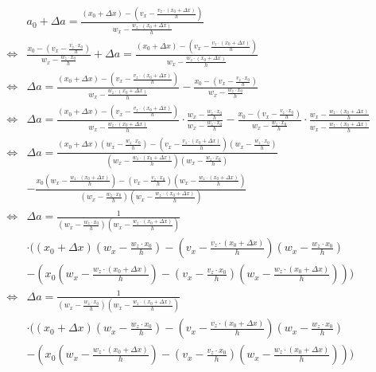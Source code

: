 \documentclass{article}
\begin{document}
\begin{align*}
         & a_0 + \Delta a = \frac{(x_0 + \Delta x) - ( v_x - \frac{v_z \cdot (x_0 + \Delta x)}{h} )}{w_x - \frac{w_z \cdot (x_0 + \Delta x)}{h}} \\
    \iff & \frac{x_0 - ( v_x - \frac{v_z \cdot x_0}{h} )}{w_x - \frac{w_z \cdot x_0}{h}} + \Delta a = \frac{(x_0 + \Delta x) - ( v_x - \frac{v_z \cdot (x_0 + \Delta x)}{h} )}{w_x - \frac{w_z \cdot (x_0 + \Delta x)}{h}} \\
    \iff & \Delta a = \frac{(x_0 + \Delta x) - ( v_x - \frac{v_z \cdot (x_0 + \Delta x)}{h} )}{w_x - \frac{w_z \cdot (x_0 + \Delta x)}{h}} - \frac{x_0 - ( v_x - \frac{v_z \cdot x_0}{h} )}{w_x - \frac{w_z \cdot x_0}{h}} \\
    \iff & \Delta a = \frac{(x_0 + \Delta x) - ( v_x - \frac{v_z \cdot (x_0 + \Delta x)}{h} )}{w_x - \frac{w_z \cdot (x_0 + \Delta x)}{h}} \cdot \frac{w_x - \frac{w_z \cdot x_0}{h}}{w_x - \frac{w_z \cdot x_0}{h}} - \frac{x_0 - ( v_x - \frac{v_z \cdot x_0}{h} )}{w_x - \frac{w_z \cdot x_0}{h}} \cdot \frac{w_x - \frac{w_z \cdot (x_0 + \Delta x)}{h}}{w_x - \frac{w_z \cdot (x_0 + \Delta x)}{h}} \\
    \iff & \Delta a = \frac{(x_0 + \Delta x)(w_x - \frac{w_z \cdot x_0}{h}) - ( v_x - \frac{v_z \cdot (x_0 + \Delta x)}{h} )(w_x - \frac{w_z \cdot x_0}{h})}{( w_x - \frac{w_z \cdot (x_0 + \Delta x)}{h} ) (w_x - \frac{w_z \cdot x_0}{h})} \\
         &- \frac{x_0 (w_x - \frac{w_z \cdot (x_0 + \Delta x)}{h}) - ( v_x - \frac{v_z \cdot x_0}{h} ) (w_x - \frac{w_z \cdot (x_0 + \Delta x)}{h})}{(w_x - \frac{w_z \cdot x_0}{h})(w_x - \frac{w_z \cdot (x_0 + \Delta x)}{h})} \\
    \iff & \Delta a = \frac{1}{(w_x - \frac{w_z \cdot x_0}{h})(w_x - \frac{w_z \cdot (x_0 + \Delta x)}{h})} \\ 
         &\cdot ((x_0 + \Delta x)(w_x - \frac{w_z \cdot x_0}{h}) - ( v_x - \frac{v_z \cdot (x_0 + \Delta x)}{h} )(w_x - \frac{w_z \cdot x_0}{h}) \\
         &- (x_0 (w_x - \frac{w_z \cdot (x_0 + \Delta x)}{h}) - ( v_x - \frac{v_z \cdot x_0}{h} ) (w_x - \frac{w_z \cdot (x_0 + \Delta x)}{h}))) \\
    \iff & \Delta a = \frac{1}{(w_x - \frac{w_z \cdot x_0}{h})(w_x - \frac{w_z \cdot (x_0 + \Delta x)}{h})} \\ 
         &\cdot ((x_0 + \Delta x)(w_x - \frac{w_z \cdot x_0}{h}) - ( v_x - \frac{v_z \cdot (x_0 + \Delta x)}{h} )(w_x - \frac{w_z \cdot x_0}{h}) \\
         &- (x_0 (w_x - \frac{w_z \cdot (x_0 + \Delta x)}{h}) - ( v_x - \frac{v_z \cdot x_0}{h} ) (w_x - \frac{w_z \cdot (x_0 + \Delta x)}{h}))) \\
\end{align*}
\end{document}
